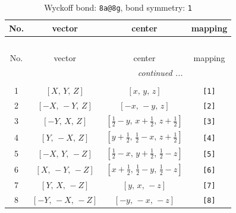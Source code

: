 \documentclass[fleqn,8pt]{jsarticle}
\begin{document}
\begin{longtable}{cccc}
\caption{Wyckoff bond: {\tt 8a@8g}, bond symmetry: {\tt 1}}
 \\
 \hline \hline
No. & vector & center & mapping \\ \hline \endfirsthead

\multicolumn{3}{l}{\tablename\ \thetable{}} \\
 \hline \hline
No. & vector & center & mapping \\ \hline \endhead

 \hline \hline
\multicolumn{3}{r}{\footnotesize\it continued ...} \\ \endfoot

 \hline \hline
\multicolumn{3}{r}{} \\ \endlastfoot

1 & $\left[ X,\, Y,\, Z \right]$ & $\left[ x,\, y,\, z \right]$ & {\tt [1]} \\ \hline
2 & $\left[ - X,\, - Y,\, Z \right]$ & $\left[ - x,\, - y,\, z \right]$ & {\tt [2]} \\ \hline
3 & $\left[ - Y,\, X,\, Z \right]$ & $\left[ \frac{1}{2} - y,\, x + \frac{1}{2},\, z + \frac{1}{2} \right]$ & {\tt [3]} \\ \hline
4 & $\left[ Y,\, - X,\, Z \right]$ & $\left[ y + \frac{1}{2},\, \frac{1}{2} - x,\, z + \frac{1}{2} \right]$ & {\tt [4]} \\ \hline
5 & $\left[ - X,\, Y,\, - Z \right]$ & $\left[ \frac{1}{2} - x,\, y + \frac{1}{2},\, \frac{1}{2} - z \right]$ & {\tt [5]} \\ \hline
6 & $\left[ X,\, - Y,\, - Z \right]$ & $\left[ x + \frac{1}{2},\, \frac{1}{2} - y,\, \frac{1}{2} - z \right]$ & {\tt [6]} \\ \hline
7 & $\left[ Y,\, X,\, - Z \right]$ & $\left[ y,\, x,\, - z \right]$ & {\tt [7]} \\ \hline
8 & $\left[ - Y,\, - X,\, - Z \right]$ & $\left[ - y,\, - x,\, - z \right]$ & {\tt [8]} \\
\end{longtable}
\end{document}
